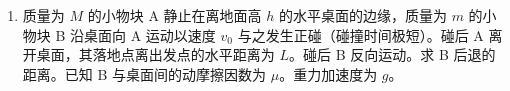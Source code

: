 \documentclass[\gkver]{gaokaozhenti}
\begin{document}
\begin{enumerate}
{第二种情况：$mg<qE$，则 $f$ 沿 $z$ 轴负方向，粒子以 $v$ 沿 $x$ 轴负向运动，由匀速运动知条件是：$qE-mg=qvB$。
}

\item
质量为 $M$ 的小物块 A 静止在离地面高 $h$ 的水平桌面的边缘，质量为 $m$ 的小物块 B 沿桌面向 A 运动以速度 $v_{0}$ 与之发生正碰（碰撞时间极短）。碰后 A 离开桌面，其落地点离出发点的水平距离为 $L$。碰后 B 反向运动。求 B 后退的距离。已知 B 与桌面间的动摩擦因数为 $\mu$。重力加速度为 $g$。




\end{enumerate}
\end{document}
